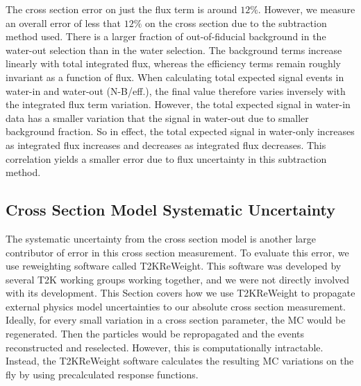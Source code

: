 The cross section error on just the flux term is around $12\%$. However, we measure an overall error of less that $12\%$ on the cross section due to the subtraction method used. There is a larger fraction of out-of-fiducial background in the water-out selection than in the water selection. The background terms increase linearly with total integrated flux, whereas the efficiency terms remain roughly invariant as a function of flux. When calculating total expected signal events in water-in and water-out (N-B/eff.), the final value therefore varies inversely with the integrated flux term variation. However, the total expected signal in water-in data has a smaller variation that the signal in water-out due to smaller background fraction. So in effect, the total expected signal in water-only increases as integrated flux increases and decreases as integrated flux decreases. This correlation yields a smaller error due to flux uncertainty in this subtraction method.

\subsection{Cross Section Model Systematic Uncertainty}
\label{sec:xsecsyst}

The systematic uncertainty from the cross section model is another large contributor of error in this cross section measurement. To evaluate this error, we use reweighting software called T2KReWeight. This software was developed by several T2K working groups working together, and we were not directly involved with its development. This Section covers how we use T2KReWeight to propagate external physics model uncertainties to our absolute cross section measurement. Ideally, for every small variation in a cross section parameter, the MC would be regenerated. Then the particles would be repropagated and the events reconstructed and reselected. However, this is computationally intractable. Instead, the T2KReWeight software calculates the resulting MC variations on the fly by using precalculated response functions. 

